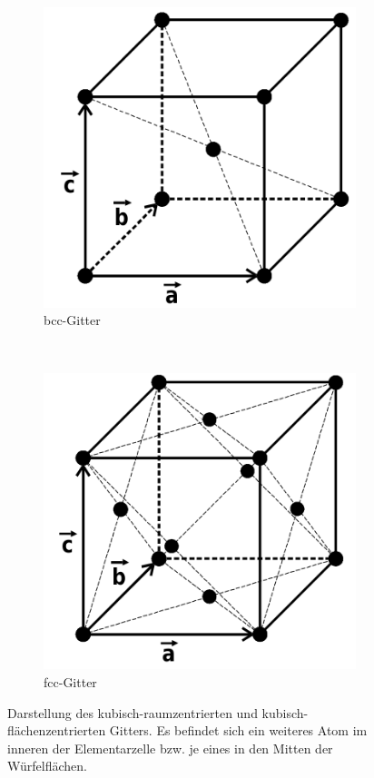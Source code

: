 \begin{figure}[htbp]
	\centering
	\begin{subfigure}[b]{0.3\textwidth}
		\includegraphics[width=\textwidth]{../pics/bcc.png}
		\caption{bcc-Gitter}
		\label{pic:bcc}
	\end{subfigure}
	~ %
	\begin{subfigure}[b]{0.3\textwidth}
		\includegraphics[width=\textwidth]{../pics/fcc.png}
		\caption{fcc-Gitter}
		\label{pic:fcc}
	\end{subfigure}
	\caption{Darstellung des kubisch-raumzentrierten und kubisch-flächenzentrierten Gitters. Es befindet sich ein weiteres Atom im inneren der Elementarzelle bzw. je eines in den Mitten der Würfelflächen.}
	\label{pic:gitterTyp1}
\end{figure}
